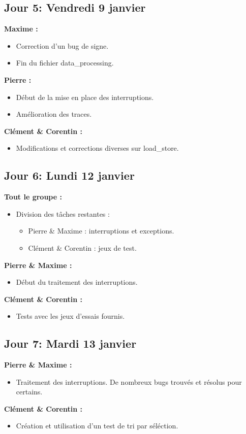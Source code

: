 \documentclass[11pt]{article} %
\begin{document}
\subsection{Jour 5: Vendredi 9  janvier}
\textbf{Maxime :}
\begin{itemize}
  \item Correction d'un bug de signe.
  \item Fin du fichier data\_processing.
\end{itemize}
\textbf{Pierre :}
\begin{itemize}
  \item Début de la mise en place des interruptions.
  \item Am\'elioration des traces.
\end{itemize}
\textbf{Cl\'ement \& Corentin :}
\begin{itemize}
  \item Modifications et corrections diverses sur load\_store.
\end{itemize}

\subsection{Jour 6: Lundi 12  janvier}
\textbf{Tout le groupe :}
\begin{itemize}
  \item Division des t\^aches restantes :
  \begin{itemize}
    \item Pierre \& Maxime : interruptions et exceptions.
    \item Cl\'ement \& Corentin : jeux de test.
  \end{itemize}
\end{itemize}
\textbf{Pierre \& Maxime :}
\begin{itemize}
  \item Début du traitement des interruptions.
\end{itemize}
\textbf{Cl\'ement \& Corentin :}
\begin{itemize}
  \item Tests avec les jeux d'essais fournis.
\end{itemize}

\subsection{Jour 7: Mardi 13  janvier}
\textbf{Pierre \& Maxime :}
\begin{itemize}
  \item Traitement des interruptions. De nombreux bugs trouvés et résolus pour certains.
\end{itemize}
\textbf{Cl\'ement \& Corentin :}
\begin{itemize}
  \item Création et utilisation d'un test de tri par s\'el\'ection. 
\end{itemize}
\end{document}
